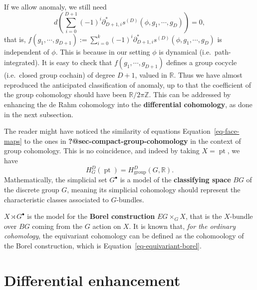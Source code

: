 \documentclass[
  letterpaper,
  DIV=11,
  numbers=noendperiod]{scrreport}
\DeclareMathOperator{\pt}{pt}
\begin{document}
If we allow anomaly, we still need \[
d\left(\sum_{i=0}^{D+1} (-1)^{i} \partial_{D+1,i}^* s^{(D)}(\phi,g_1,\cdots,g_D)\right) = 0,
\] that is,
\(f(g_1,\cdots,g_{D+1}) := \sum_{i=0}^{k} (-1)^{i} \partial_{D+1,i}^* s^{(D)}(\phi,g_1,\cdots,g_D)\)
is independent of \(\phi\). This is because in our setting \(\phi\) is
dynamical (i.e.~path-integrated). It is easy to check that
\(f(g_1,\cdots,g_{D+1})\) defines a group cocycle (i.e.~closed group
cochain) of degree \(D+1\), valued in \(\mathbb{R}\). Thus we have
almost reproduced the anticipated classification of anomaly, up to that
the coefficient of the group cohomology should have been
\(\mathbb{R}/2\pi \mathbb{Z}\). This can be addressed by enhancing the
de Rahm cohomology into the \textbf{differential cohomology}, as done in
the next subsection.

\begin{tcolorbox}[enhanced jigsaw, opacityback=0, opacitybacktitle=0.6, leftrule=.75mm, arc=.35mm, coltitle=black, breakable, colframe=quarto-callout-note-color-frame, titlerule=0mm, colback=white, bottomrule=.15mm, left=2mm, colbacktitle=quarto-callout-note-color!10!white, toptitle=1mm, bottomtitle=1mm, title=\textcolor{quarto-callout-note-color}{\faInfo}\hspace{0.5em}{Relation to Group Cohomology and Borel Construction}, rightrule=.15mm, toprule=.15mm]

The reader might have noticed the similarity of equations
Equation~\ref{eq-face-maps} to the ones in
\textbf{?@sec-compact-group-cohomology} in the context of group
cohomology. This is no coincidence, and indeed by taking \(X=\pt\), we
have \[
H^D_G(\pt) = H^D_\text{group}(G,\mathbb{R}).
\] Mathematically, the simplicial set \(G^\bullet\) is a model of the
\textbf{classifying space} \(BG\) of the discrete group \(G\), meaning
its simplicial cohomology should represent the characteristic classes
associated to \(G\)-bundles.

\(X\rtimes G^\bullet\) is the model for the \textbf{Borel construction}
\(EG \times_G X\), that is the \(X\)-bundle over \(BG\) coming from the
\(G\) action on \(X\). It is known that, \emph{for the ordinary
cohomology}, the equivariant cohomology can be defined as the
cohomoology of the Borel construction, which is
Equation~\ref{eq-equivariant-borel}.

\end{tcolorbox}

\section{Differential enhancement}\label{sec-equivariant-differential}
\end{document}
